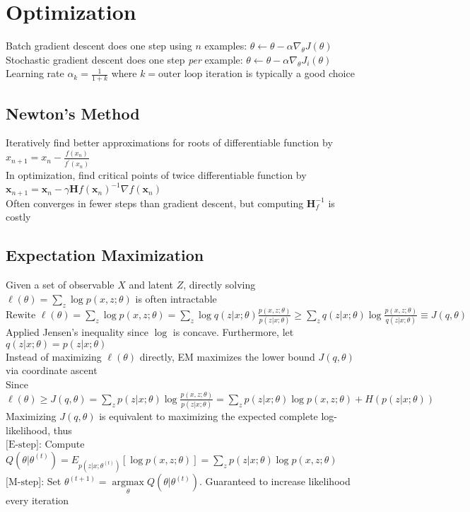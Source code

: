 \documentclass{article}
\DeclareMathOperator*{\argmax}{argmax}
\begin{document}
\section{Optimization}
Batch gradient descent does one step using $n$ examples: $ \theta \leftarrow \theta - \alpha \nabla_\theta J(\theta)$ \\
Stochastic gradient descent does one step \textit{per} example: $\theta \leftarrow \theta - \alpha \nabla_\theta J_i(\theta)$ \\
Learning rate $\alpha_k = \frac{1}{1+k}$ where $k = \mbox{outer loop iteration}$ is typically a good choice

\subsection{Newton's Method}
Iteratively find better approximations for roots of differentiable function by $x_{n+1} = x_n - \frac{f(x_n)}{f^\prime(x_n)}$ \\
In optimization, find critical points of twice differentiable function by $\boldsymbol{x}_{n+1} = \boldsymbol{x}_n - \gamma \boldsymbol{H}f(\boldsymbol{x}_n)^{-1} \nabla f(\boldsymbol{x}_n) $ \\
Often converges in fewer steps than gradient descent, but computing $\boldsymbol{H}_f^{-1}$ is costly 

\subsection{Expectation Maximization}
Given a set of observable $X$ and latent $Z$, directly solving $\ell(\theta) = \sum_z \log p(x, z ; \theta)$ is often intractable \\
${\mbox{Rewite }\ell(\theta) = \sum_z \log p(x, z ; \theta) = \sum_z \log q(z|x; \theta) \frac{p(x, z ; \theta)}{p(z | x;\theta)} \geq \sum_z q(z | x; \theta) \log  \frac{p(x, z ; \theta)}{q(z | x;\theta)} \equiv J(q, \theta)}$ \\
Applied Jensen's inequality since $\log$ is concave. Furthermore, let $q(z| x; \theta) = p(z|x;\theta)$ \\
Instead of maximizing $\ell(\theta)$ directly, EM maximizes the lower bound $J(q, \theta)$ via coordinate ascent \\
Since $\ell(\theta) \geq J(q, \theta) = \sum_z p(z|x; \theta) \log \frac{p(x, z ; \theta)}{p(z | x;\theta)} = \sum_z p(z|x; \theta) \log p(x, z ; \theta) + H(p(z|x;\theta))$ \\
Maximizing $J(q, \theta)$ is equivalent to maximizing the expected complete log-likelihood, thus \\
$\mbox{[E-step]}$: Compute $Q(\theta | \theta^{(t)}) = E_{p(z|x;\theta^{(t)})}[\log p(x, z ;\theta)] =  \sum_z p(z|x; \theta) \log p(x, z ; \theta) $ \\
$\mbox{[M-step]}$: Set $\theta^{(t+1)} = \argmax\limits_\theta Q(\theta | \theta^{(t)})$. Guaranteed to increase likelihood every iteration
\end{document}
